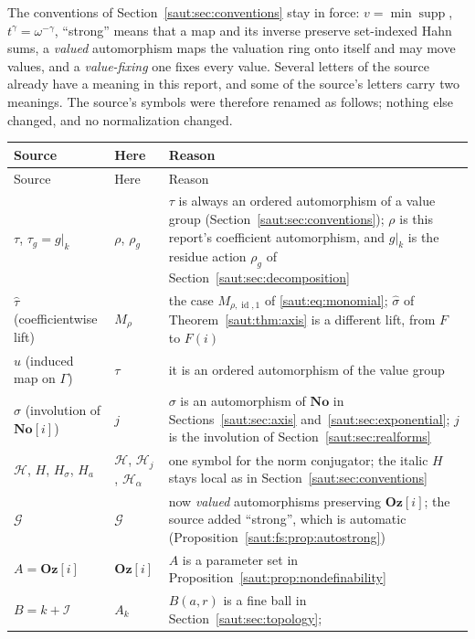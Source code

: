 \documentclass[11pt]{article}
\theoremstyle{definition}
\theoremstyle{remark}
\newcommand{\No}{\mathbf{No}}
\newcommand{\id}{\operatorname{id}}
\newcommand{\supp}{\operatorname{supp}}
\newcommand{\Oz}{\mathbf{Oz}}
\newcommand{\Ineg}{\mathcal I}
\numberwithin{equation}{section}
\begin{document}
The conventions of Section~\ref{saut:sec:conventions} stay in force: $v=\min\supp$,
$t^\gamma=\omega^{-\gamma}$, ``strong'' means that a map and its inverse preserve
set-indexed Hahn sums, a \emph{valued} automorphism maps the valuation ring onto
itself and may move values, and a \emph{value-fixing} one fixes every value.
Several letters of the source already have a meaning in this report, and some
of the source's letters carry two meanings. The source's symbols were therefore
renamed as follows; nothing else changed, and no normalization changed.
\begin{center}
\small
\begin{longtable}{@{}>{\RaggedRight\arraybackslash}p{}>{\RaggedRight\arraybackslash}p{}>{\RaggedRight\arraybackslash}p{}@{}}
\toprule
Source & Here & Reason\\
\midrule
\endfirsthead
\toprule
Source & Here & Reason\\
\midrule
\endhead
$\tau$, $\tau_g=g|_k$ & $\rho$, $\rho_g$ & $\tau$ is always an ordered automorphism of a value
group (Section~\ref{saut:sec:conventions}); $\rho$ is this report's coefficient
automorphism, and $g|_k$ is the residue action $\rho_g$ of
Section~\ref{saut:sec:decomposition}\\
$\widehat\tau$ (coefficientwise lift) & $M_\rho$ & the case $M_{\rho,\id,1}$ of
\eqref{saut:eq:monomial}; $\widehat\sigma$ of Theorem~\ref{saut:thm:axis} is a
different lift, from $F$ to $F(i)$\\
$u$ (induced map on $\Gamma$) & $\tau$ & it is an ordered automorphism of the value
group\\
$\sigma$ (involution of $\No[i]$) & $j$ & $\sigma$ is an automorphism of $\No$ in
Sections~\ref{saut:sec:axis} and~\ref{saut:sec:exponential}; $j$ is the involution
of Section~\ref{saut:sec:realforms}\\
$\mathcal H$, $H$, $H_\sigma$, $H_a$ & $\mathcal H$, $\mathcal H_j$, $\mathcal H_\alpha$ &
one symbol for the norm conjugator; the italic $H$ stays local as in
Section~\ref{saut:sec:conventions}\\
$\mathcal G$ & $\mathcal G$ & now \emph{valued} automorphisms preserving $\Oz[i]$; the
source added ``strong'', which is automatic (Proposition~\ref{saut:fs:prop:autostrong})\\
$A=\Oz[i]$ & $\Oz[i]$ & $A$ is a parameter set in
Proposition~\ref{saut:prop:nondefinability}\\
$B=k+\Ineg$ & $A_k$ & $B(a,r)$ is a fine ball in Section~\ref{saut:sec:topology};

\end{longtable}
\end{center}
\end{document}
